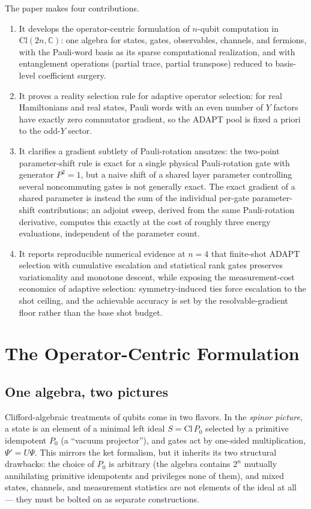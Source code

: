 \documentclass[11pt]{article}
\newcommand{\Cl}{\mathrm{Cl}}
\newcommand{\C}{\mathbb{C}}
\begin{document}
The paper makes four contributions.
\begin{enumerate}[leftmargin=*]
    \item It develops the operator-centric formulation of $n$-qubit computation in $\Cl(2n,\C)$: one algebra for states, gates, observables, channels, and fermions, with the Pauli-word basis as its sparse computational realization, and with entanglement operations (partial trace, partial transpose) reduced to basis-level coefficient surgery.
    \item It proves a reality selection rule for adaptive operator selection: for real Hamiltonians and real states, Pauli words with an even number of $Y$ factors have exactly zero commutator gradient, so the ADAPT pool is fixed a priori to the odd-$Y$ sector.
    \item It clarifies a gradient subtlety of Pauli-rotation ansatzes: the two-point parameter-shift rule is exact for a single physical Pauli-rotation gate with generator $P^2=1$, but a naive shift of a shared layer parameter controlling several noncommuting gates is not generally exact.  The exact gradient of a shared parameter is instead the sum of the individual per-gate parameter-shift contributions; an adjoint sweep, derived from the same Pauli-rotation derivative, computes this exactly at the cost of roughly three energy evaluations, independent of the parameter count.
    \item It reports reproducible numerical evidence at $n=4$ that finite-shot ADAPT selection with cumulative escalation and statistical rank gates preserves variationality and monotone descent, while exposing the measurement-cost economics of adaptive selection: symmetry-induced ties force escalation to the shot ceiling, and the achievable accuracy is set by the resolvable-gradient floor rather than the base shot budget.
\end{enumerate}

\section{The Operator-Centric Formulation}
\label{sec:operator-centric}

\subsection{One algebra, two pictures}

Clifford-algebraic treatments of qubits come in two flavors.  In the \emph{spinor picture}, a state is an element of a minimal left ideal $S=\Cl\,P_0$ selected by a primitive idempotent $P_0$ (a ``vacuum projector''), and gates act by one-sided multiplication, $\Psi'=U\Psi$.  This mirrors the ket formalism, but it inherits its two structural drawbacks: the choice of $P_0$ is arbitrary (the algebra contains $2^n$ mutually annihilating primitive idempotents and privileges none of them), and mixed states, channels, and measurement statistics are not elements of the ideal at all --- they must be bolted on as separate constructions.
\end{document}
